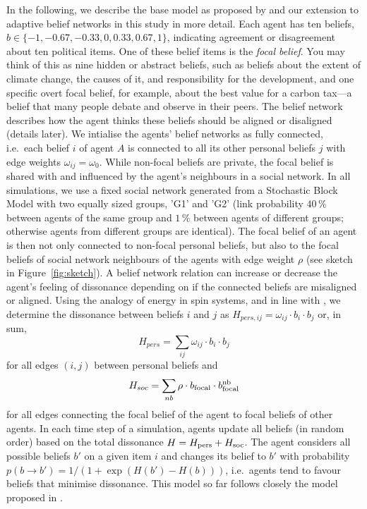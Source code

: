 In the following, we describe the base model as proposed by \citet{dalegeNetworksBeliefsIntegrative2025} and our extension to adaptive belief networks in this study in more detail. Each agent has ten beliefs, $b\in\{-1, -0.67, -0.33, 0, 0.33, 0.67, 1\}$, indicating agreement or disagreement about ten political items. One of these belief items is the \textit{focal belief}. You may think of this as nine hidden or abstract beliefs, such as beliefs about the extent of climate change, the causes of it, and responsibility for the development, and one specific overt focal belief, for example, about the best value for a carbon tax---a belief that many people debate and observe in their peers. The belief network describes how the agent thinks these beliefs should be aligned or disaligned (details later). We intialise the agents' belief networks as fully connected, i.e.\ each belief $i$ of agent $A$ is connected to all its other personal beliefs $j$ with edge weights $\omega_{ij} = \omega_0$. While non-focal beliefs are private, the focal belief is shared with and influenced by the agent's neighbours in a social network. In all simulations, we use a fixed social network generated from a Stochastic Block Model with two equally sized groups, 'G1' and 'G2' (link probability $40\,\%$ between agents of the same group and $1\,\%$ between agents of different groups; otherwise agents from different groups are identical). The focal belief of an agent is then not only connected to non-focal personal beliefs, but also to the focal beliefs of social network neighbours of the agents with edge weight $\rho$ (see sketch in Figure~\ref{fig:sketch}). A belief network relation can increase or decrease the agent's feeling of dissonance depending on if the connected beliefs are misaligned or aligned. Using the analogy of energy in spin systems, and in line with \citeauthor{dalegeNetworksBeliefsIntegrative2025}, we determine the dissonance between beliefs $i$ and $j$ as $H_{pers, ij} = \omega_{ij} \cdot b_i \cdot b_j$ or, in sum, 
\begin{equation}
H_{pers} = \sum_{ij} \omega_{ij} \cdot b_i \cdot b_j
\end{equation}
for all edges $(i,j)$ between personal beliefs and 
\begin{equation}
H_{soc} = \sum_{nb} \rho \cdot b_{\rm focal} \cdot b^{\rm nb}_{\rm focal}
\end{equation}
for all edges connecting the focal belief of the agent to focal beliefs of other agents. In each time step of a simulation, agents update all beliefs (in random order) based on the total dissonance $H = H_{\rm pers} + H_{\rm soc}$. The agent considers all possible beliefs $b'$ on a given item $i$ and changes its belief to $b'$ with probability $p(b \rightarrow b') = 1 / \left(1+\exp(H(b') - H(b))\right)$, i.e.\ agents tend to favour beliefs that minimise dissonance. This model so far follows closely the model proposed in \citet{dalegeNetworksBeliefsIntegrative2025}. 

